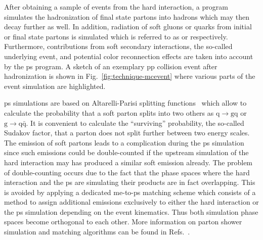 After obtaining a sample of events from the hard interaction, a  program simulates the hadronization of final state partons into hadrons which may then decay further as well. In addition, radiation of soft gluons or quarks from initial or final state partons is simulated which is referred to as  or  respectively. Furthermore, contributions from soft secondary interactions, the so-called underlying event, and potential color reconnection effects are taken into account by the \gls{ps} program. A sketch of an exemplary pp collision event after hadronization is shown in Fig.~\ref{fig:technique-mcevent} where various parts of the event simulation are highlighted. 

\Gls{ps} simulations are based on Altarelli-Parisi splitting functions~\cite{Altarelli:1977zs} which allow to calculate the probability that a soft parton splits into two others as $\mathrm{q}\to \mathrm{gq}$ or $\mathrm{g}\to \mathrm{q}\bar{\mathrm{q}}$. It is convenient to calculate the ``surviving'' probability, the so-called Sudakov factor, that a parton does not split further between two energy scales. The emission of soft partons leads to a complication during the \gls{ps} simulation since such emissions could be double-counted if the upstream simulation of the hard interaction may has produced a similar soft emission already.
The problem of double-counting occurs due to the fact that the phase spaces where the hard interaction and the \gls{ps} are simulating their products are in fact overlapping. This is avoided by applying a dedicated \gls{me}-to-\gls{ps} matching scheme which consists of a method to assign additional emissions exclusively to either the hard interaction or the \gls{ps} simulation depending on the event kinematics. Thus both simulation phase spaces become orthogonal to each other. More information on parton shower simulation and matching algorithms can be found in Refs.~\cite{Hoche:2014rga,Alwall:2007fs}.



